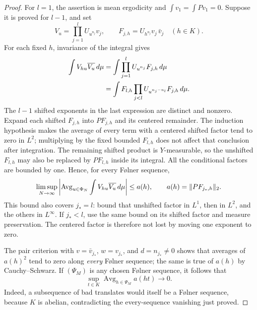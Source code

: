 \begin{proof}
For $l=1$, the assertion is mean ergodicity and
$\int v_1=\int Pv_1=0$.  Suppose it is proved for $l-1$, and set
\[
 V_u=\prod_{j=1}^lU_{u^{n_j}}v_j,
 \qquad F_{j,h}=U_{h^{n_j}}v_j\,\bar v_j\quad(h\in K).
\]
For each fixed $h$, invariance of the integral gives
\begin{align}
 \int V_{hu}\overline{V_u}\,d\mu
 &=\int\prod_{j=1}^lU_{u^{n_j}}F_{j,h}\,d\mu\notag\\
 &=\int F_{l,h}\prod_{j<l}U_{u^{n_j-n_l}}F_{j,h}\,d\mu.
 \label{eq:rigidity-vdc-correlation}
\end{align}
The $l-1$ shifted exponents in the last expression are distinct and
nonzero.  Expand each shifted $F_{j,h}$ into $PF_{j,h}$ and its centered
remainder.  The induction hypothesis makes the average of every term
with a centered shifted factor tend to zero in $L^2$; multiplying by the
fixed bounded $F_{l,h}$ does not affect that conclusion after integration.
The remaining shifted product is $Y$-measurable, so the unshifted
$F_{l,h}$ may also be replaced by $PF_{l,h}$ inside its integral.
All the conditional factors are bounded by one.  Hence, for every
F\o lner sequence,
\begin{equation}\label{eq:rigidity-correlation-bound}
 \limsup_{N\to\infty}
 \left|\operatorname{Avg}_{u\in\Phi_N}
       \int V_{hu}\overline{V_u}\,d\mu\right|
 \leq a(h),
 \qquad a(h)=\lVert PF_{j_*,h}\rVert_2.
\end{equation}
This bound also covers $j_*=l$: bound that unshifted factor in $L^1$,
then in $L^2$, and the others in $L^\infty$.  If $j_*<l$, use the same
bound on its shifted factor and measure preservation.  The centered
factor is therefore not lost by moving one exponent to zero.

The pair criterion with $v=\bar v_{j_*}$, $w=v_{j_*}$, and
$d=n_{j_*}\ne0$ shows that averages of $a(h)^2$ tend to zero along
\emph{every} F\o lner sequence; the same is true of $a(h)$ by
Cauchy--Schwarz.  If $(\Psi_M)$ is any chosen F\o lner sequence, it follows
that
\begin{equation}\label{eq:rigidity-uniform-translates}
 \sup_{t\in K}\operatorname{Avg}_{h\in\Psi_M}a(ht)
 \longrightarrow0.
\end{equation}
Indeed, a subsequence of bad translates would itself be a F\o lner
sequence, because $K$ is abelian, contradicting the every-sequence
vanishing just proved.


\end{proof}
